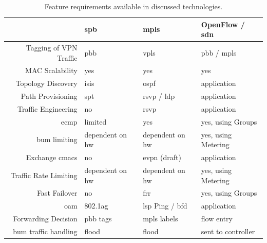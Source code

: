 \begin{table}[h]
	\centering
	\begin{tabular}{r|lll}
	 & \acs{spb} & \acs{mpls} & OpenFlow / \acs{sdn}\\
	\hline
	Tagging of VPN Traffic & \acs{pbb} & \acs{vpls} & \acs{pbb} / \acs{mpls}\\
	MAC Scalability & yes & yes & yes\\
	Topology Discovery & \acs{isis} & \acs{ospf} & application\\
	Path Provisioning & \acs{spt} & \acs{rsvp} / \acs{ldp} & application\\
	Traffic Engineering & no & \acs{rsvp} & application\\
	\ac{ecmp} & limited & yes & yes, using Groups\\
	\ac{bum} limiting & dependent on \acs{hw} & dependent on \acs{hw} & yes, using Metering\\
	Exchange \acsp{cmac} & no & \ac{evpn} (draft) & application\\
	Traffic Rate Limiting & dependent on \acs{hw} & dependent on \acs{hw} & yes, using Metering\\
	Fast Failover & no & \acs{frr} & yes, using Groups\\
	\acs{oam} & 802.1ag & \acs{lsp} Ping / \acs{bfd} & application\\
	\hline
	Forwarding Decision & \acs{pbb} tags & \acs{mpls} labels & flow entry \\
	\ac{bum} traffic handling & flood & flood & sent to controller\\
	\end{tabular}
	\caption{Feature requirements available in discussed technologies.}
	\label{tb:reqs}
\end{table}

